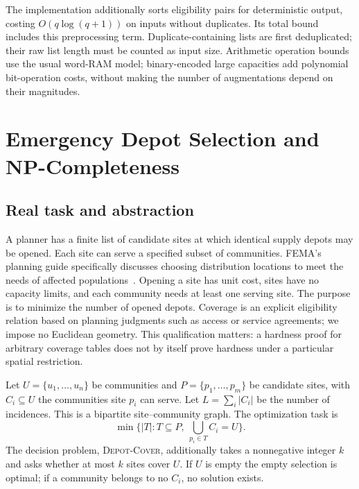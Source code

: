 \documentclass[sigconf,nonacm]{acmart}
\begin{document}
The implementation additionally sorts eligibility pairs for deterministic
output, costing $O(q\log(q+1))$ on inputs without duplicates. Its total bound
includes this preprocessing term. Duplicate-containing lists are first
deduplicated; their raw list length must be counted as input size. Arithmetic
operation bounds use the usual word-RAM model; binary-encoded large
capacities add polynomial bit-operation costs, without making the number of
augmentations depend on their magnitudes.

\section{Emergency Depot Selection and NP-Completeness}
\subsection{Real task and abstraction}
A planner has a finite list of candidate sites at which identical supply
depots may be opened. Each site can serve a specified subset of communities.
FEMA's planning guide specifically discusses choosing distribution locations
to meet the needs of affected populations~\cite{fema}.
Opening a site has unit cost, sites have no capacity limits, and each
community needs at least one serving site. The purpose is to minimize the
number of opened depots. Coverage is an explicit eligibility relation based
on planning judgments such as access or service agreements; we impose no
Euclidean geometry. This qualification matters: a hardness proof for arbitrary
coverage tables does not by itself prove hardness under a particular spatial
restriction.

Let $U=\{u_1,\ldots,u_n\}$ be communities and
$P=\{p_1,\ldots,p_m\}$ be candidate sites, with $C_i\subseteq U$ the
communities site $p_i$ can serve. Let $L=\sum_i|C_i|$ be the number of
incidences. This is a bipartite site--community graph. The optimization task is
\[
\min\{|T|:T\subseteq P,\ \bigcup_{p_i\in T}C_i=U\}.
\]
The decision problem, \textsc{Depot-Cover}, additionally takes a nonnegative
integer $k$ and asks whether at most $k$ sites cover $U$. If $U$ is empty the
empty selection is optimal; if a community belongs to no $C_i$, no solution
exists.
\end{document}
